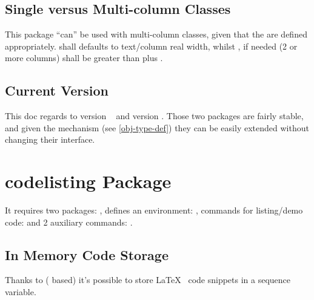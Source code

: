 \documentclass{article}
\begin{document}
\subsection{Single versus Multi-column Classes}
This package ``can'' be used with multi-column classes, given that the \tsobj[code]{\linewidth,\columnsep} are defined appropriately. \tsobj{\linewidth} shall defaults to text/column real width, whilst \tsobj{\columnsep}, if needed (2 or more columns) shall be greater than \tsobj{\marginparwidth} plus \tsobj{\marginparsep}.

\subsection{Current Version}
This doc regards to  version ~ and  version . Those two packages are fairly stable, and given the  mechanism (see \ref{obj-type-def}) they can be easily extended without changing their interface.

\section{codelisting Package}

It requires two packages: ,  defines an environment: , commands for listing/demo code: \tsobj[code]{\tscode,\tsmergedcode,\tsdemo,\tsresult,\tsexec} and 2 auxiliary commands: \tsobj{\setcodekeys,\setnewcodekey}.

\subsection{In Memory Code Storage}
Thanks to  ( based) it's possible to store \LaTeX~ code snippets in a  sequence variable.
\end{document}
